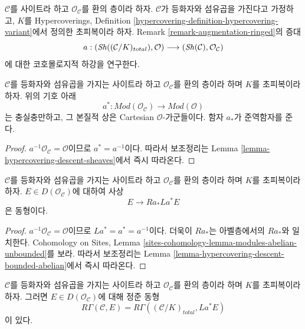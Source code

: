 \noindent
$\mathcal{C}$를 사이트라 하고 $\mathcal{O}_\mathcal{C}$를 환의 층이라
하자. $\mathcal{C}$가 등화자와 섬유곱을 가진다고 가정하고, $K$를
Hypercoverings, Definition
\ref{hypercovering-definition-hypercovering-variant}에서 정의한
초피복이라 하자. Remark \ref{remark-augmentation-ringed}의 증대
$$
a :
(\mathop{\mathit{Sh}}\nolimits((\mathcal{C}/K)_{total}), \mathcal{O})
\longrightarrow
(\mathop{\mathit{Sh}}\nolimits(\mathcal{C}), \mathcal{O}_\mathcal{C})
$$
에 대한 코호몰로지적 하강을 연구한다.

\begin{lemma}
\label{lemma-hypercovering-descent-modules}
$\mathcal{C}$를 등화자와 섬유곱을 가지는 사이트라 하고
$\mathcal{O}_\mathcal{C}$를 환의 층이라 하며 $K$를 초피복이라 하자.
위의 기호 아래
$$
a^* : \textit{Mod}(\mathcal{O}_\mathcal{C}) \to \textit{Mod}(\mathcal{O})
$$
는 충실충만하고, 그 본질적 상은 Cartesian $\mathcal{O}$-가군들이다.
함자 $a_*$가 준역함자를 준다.
\end{lemma}

\begin{proof}
$a^{-1}\mathcal{O}_\mathcal{C} = \mathcal{O}$이므로
$a^* = a^{-1}$이다. 따라서 보조정리는 Lemma
\ref{lemma-hypercovering-descent-sheaves}에서 즉시 따라온다.
\end{proof}

\begin{lemma}
\label{lemma-hypercovering-descent-bounded-modules}
$\mathcal{C}$를 등화자와 섬유곱을 가지는 사이트라 하고
$\mathcal{O}_\mathcal{C}$를 환의 층이라 하며 $K$를 초피복이라 하자.
$E \in D(\mathcal{O}_\mathcal{C})$에 대하여 사상
$$
E \longrightarrow Ra_*La^*E
$$
은 동형이다.
\end{lemma}

\begin{proof}
$a^{-1}\mathcal{O}_\mathcal{C} = \mathcal{O}$이므로
$La^* = a^* = a^{-1}$이다. 더욱이 $Ra_*$는 아벨층에서의
$Ra_*$와 일치한다. Cohomology on Sites, Lemma
\ref{sites-cohomology-lemma-modules-abelian-unbounded}를 보라.
따라서 보조정리는 Lemma
\ref{lemma-hypercovering-descent-bounded-abelian}에서 즉시 따라온다.
\end{proof}

\begin{lemma}
\label{lemma-compare-cohomology-hypercovering-modules}
$\mathcal{C}$를 등화자와 섬유곱을 가지는 사이트라 하고
$\mathcal{O}_\mathcal{C}$를 환의 층이라 하며 $K$를 초피복이라 하자.
그러면 $E \in D(\mathcal{O}_\mathcal{C})$에 대해 정준 동형
$$
R\Gamma(\mathcal{C}, E) =
R\Gamma((\mathcal{C}/K)_{total}, La^*E)
$$
이 있다.
\end{lemma}

